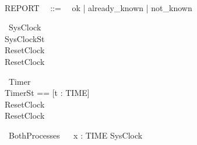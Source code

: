 \documentclass{llncs}
\begin{document}
\begin{zed}
\\
REPORT ~~::=~~ ok | already\_known | not\_known\\
\end{zed}
\begin{circus}
\circprocess ~SysClock ~\circdef~ 
\circbegin\\
  \circstate SysClockSt \\
  ResetClock ~\circdef~\Skip\\
  \circspot ResetClock\\
  \circend
\end{circus}
\begin{circus}
\circprocess ~Timer ~\circdef~ 
\circbegin\\
  \circstate TimerSt == [t : TIME]\\
  ResetClock ~\circdef~\Skip\\
  \circspot ResetClock\\
  \circend
\end{circus}
\begin{circus}
\circprocess ~BothProcesses ~\circdef~ \Intchoice x : TIME \circspot SysClock\\
\end{circus}
\end{document}
